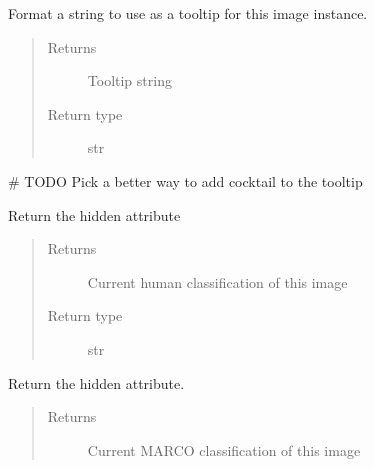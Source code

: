 \documentclass[letterpaper,10pt,english]{sphinxmanual}
\begin{document}
\begin{fulllineitems}
\begin{fulllineitems}
\label{\detokenize{polo.crystallography:polo.crystallography.image.Image.get_tool_tip}}
Format a string to use as a tooltip for this image instance.
\begin{quote}\begin{description}
\item[{Returns}] \leavevmode
Tooltip string

\item[{Return type}] \leavevmode
str

\end{description}\end{quote}

\# TODO Pick a better way to add cocktail to the tooltip

\end{fulllineitems}


\begin{fulllineitems}
\label{\detokenize{polo.crystallography:polo.crystallography.image.Image.human_class}}
Return the  hidden attribute
\begin{quote}\begin{description}
\item[{Returns}] \leavevmode
Current human classification of this image

\item[{Return type}] \leavevmode
str

\end{description}\end{quote}

\end{fulllineitems}


\begin{fulllineitems}
\label{\detokenize{polo.crystallography:polo.crystallography.image.Image.marco_class}}
Return the  hidden attribute.
\begin{quote}\begin{description}
\item[{Returns}] \leavevmode
Current MARCO classification of this image


\end{description}
\end{quote}
\end{fulllineitems}
\end{fulllineitems}
\end{document}
